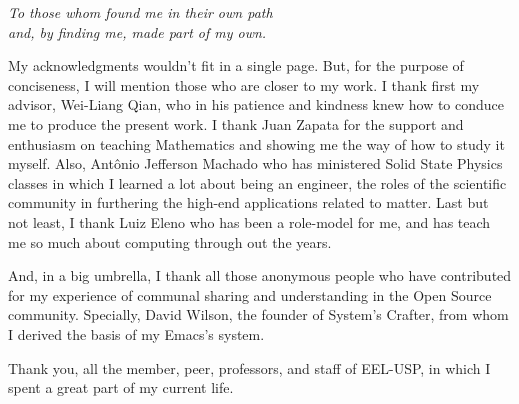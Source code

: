 \documentclass[
12pt,				%
openright,			%
oneside,			%
a4paper,			%
brazil,				%
english,			%
]{abntex2}
\begin{document}
\begin{dedicatoria}
   \vspace*{\fill}
   \centering
   \noindent
   \textit{To those whom found me in their own path\\
     and, by finding me, made part of my own.} \vspace*{\fill}
\end{dedicatoria}

\begin{agradecimentos}

  My acknowledgments wouldn't fit in a single page. But, for the purpose of conciseness, I will mention those who are closer to my work. I thank first my advisor, Wei-Liang Qian, who in his patience and kindness knew how to conduce me to produce the present work. I thank Juan Zapata for the support and enthusiasm on teaching Mathematics and showing me the way of how to study it myself. Also, Antônio Jefferson Machado who has ministered Solid State Physics classes in which I learned a lot about being an engineer, the roles of the scientific community in furthering the high-end applications related to matter. Last but not least, I thank Luiz Eleno who has been a role-model for me, and has teach me so much about computing through out the years.

  And, in a big umbrella, I thank all those anonymous people who have contributed for my experience of communal sharing and understanding in the Open Source community. Specially, David Wilson, the founder of System's Crafter, from whom I derived the basis of my Emacs's system.

  Thank you, all the member, peer, professors, and staff of EEL-USP, in which I spent a great part of my current life.
\end{agradecimentos}
\end{document}

